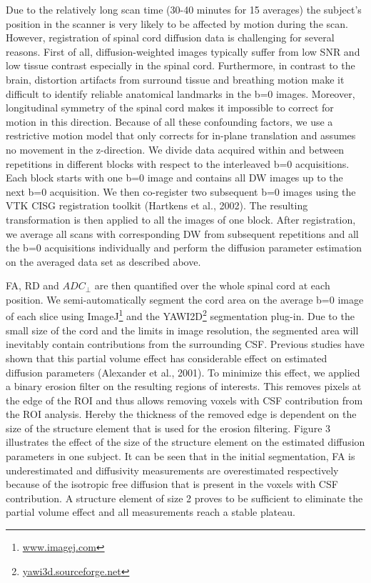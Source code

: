 Due to the relatively long scan time (30-40 minutes for 15 averages) the subject’s position in the scanner is very likely to be affected by motion during the scan. However, registration of spinal cord diffusion data is challenging for several reasons. First of all, diffusion-weighted images typically suffer from low SNR and low tissue contrast especially in the spinal cord. Furthermore, in contrast to the brain, distortion artifacts from surround tissue and breathing motion make it difficult to identify reliable anatomical landmarks in the b=0 images. Moreover, longitudinal symmetry of the spinal cord makes it impossible to correct for motion in this direction. Because of all these confounding factors, we use a restrictive motion model that only corrects for in-plane translation and assumes no movement in the z-direction. We divide data acquired within and between repetitions in different blocks with respect to the interleaved b=0 acquisitions. Each block starts with one b=0 image and contains all DW images up to the next b=0 acquisition. We then co-register two subsequent b=0 images using the VTK CISG registration toolkit (Hartkens et al., 2002). The resulting transformation is then applied to all the images of one block. After registration, we average all scans with corresponding DW from subsequent repetitions and all the b=0 acquisitions individually and perform the diffusion parameter estimation on the averaged data set as described above.

FA, RD and $ADC_\perp$ are then quantified over the whole spinal cord at each position. We semi-automatically segment the cord area on the average b=0 image of each slice using ImageJ\footnote{\url{www.imagej.com}} and the YAWI2D\footnote{\url{yawi3d.sourceforge.net}} segmentation plug-in. Due to the small size of the cord and the limits in image resolution, the segmented area will inevitably contain contributions from the surrounding CSF. Previous studies have shown that this partial volume effect has considerable effect on estimated diffusion parameters (Alexander et al., 2001). To minimize this effect, we applied a binary erosion filter on the resulting regions of interests. This removes pixels at the edge of the ROI and thus allows removing voxels with CSF contribution from the ROI analysis. Hereby the thickness of the removed edge is dependent on the size of the structure element that is used for the erosion filtering. Figure 3 illustrates the effect of the size of the structure element on the estimated diffusion parameters in one subject. It can be seen that in the initial segmentation, FA is underestimated and diffusivity measurements are overestimated respectively because of the isotropic free diffusion that is present in the voxels with CSF contribution. A structure element of size 2 proves to be sufficient to eliminate the partial volume effect and all measurements reach a stable plateau.


